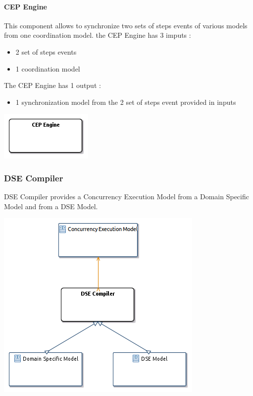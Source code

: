 \documentclass{gemoc} %
\begin{document}
\paragraph{CEP Engine}
\label{sec:CEP_Engine}
This component allows to synchronize two sets of steps events of various models from one coordination model.
\newline the CEP Engine has 3 imputs :
\begin{itemize}
\item 2 set of steps events
\item 1 coordination model
\end{itemize}
The CEP Engine has 1 output :
\begin{itemize}
\item 1 synchronization model from the 2 set of steps event provided in inputs
\end{itemize}

\begin{center}
\includegraphics*[trim=0.0cm 0.0cm 0cm 0.0cm, clip=true]{../images/generated/Generated_CEP_Engine.png}
\end{center}





\subsubsection{DSE Compiler}
\label{sec:DSE_Compiler}
DSE Compiler provides a Concurrency Execution Model from a Domain Specific Model and from a DSE Model.
\begin{center}
\includegraphics*[trim=0.0cm 0.0cm 0cm 0.0cm, clip=true]{../images/generated/Generated_DSE_Compiler.png}
\end{center}
\end{document}
